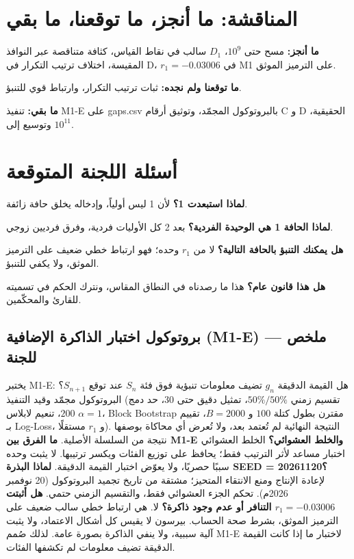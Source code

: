 \documentclass[12pt,a4paper]{article}
\begin{document}
\section{المناقشة: ما أنجز، ما توقعنا، ما بقي}
\textbf{ما أنجز:} مسح حتى $10^9$، $D_1$ سالب في نقاط القياس، كثافة متناقصة عبر النوافذ المقيسة، اختلاف ترتيب التكرار في D، $r_1=-0.03006$ في M1 على الترميز الموثق.

\textbf{ما توقعنا ولم نجده:} ثبات ترتيب التكرار، وارتباط قوي للتنبؤ.

\textbf{ما بقي:} تنفيذ M1-E على \textenglish{gaps.csv} بالبروتوكول المجمّد، وتوثيق أرقام C و D الحقيقية، وتوسيع إلى $10^{11}$.

\section{أسئلة اللجنة المتوقعة}
\textbf{لماذا استبعدت 1؟} لأن 1 ليس أولياً، وإدخاله يخلق حافة زائفة.

\textbf{لماذا الحافة 1 هي الوحيدة الفردية؟} بعد 2 كل الأوليات فردية، وفرق فرديين زوجي.

\textbf{هل يمكنك التنبؤ بالحافة التالية؟} لا من $r_1$ وحده؛ فهو ارتباط خطي ضعيف على الترميز الموثق، ولا يكفي للتنبؤ.

\textbf{هل هذا قانون عام؟} هذا ما رصدناه في النطاق المقاس، ونترك الحكم في تسميته للقارئ والمحكّمين.

\subsection*{بروتوكول اختبار الذاكرة الإضافية (\textenglish{M1-E}) — ملخص للجنة}
يختبر \textenglish{M1-E}: هل القيمة الدقيقة $g_n$ تضيف معلومات تنبؤية فوق فئة $S_n$ عند توقع $S_{n+1}$؟ البروتوكول مجمّد وقيد التنفيذ (تقسيم زمني $50\%/50\%$، تمثيل دقيق حتى $30$، حد دمج $200$، تنعيم لابلاس $\alpha=1$، \textenglish{Block Bootstrap} مقترن بطول كتلة $100$ و $B=2000$، تقييم بـ \textenglish{Log-Loss}، و $r_1$ مستقلًا). النتيجة النهائية لم تُعتمد بعد، ولا تُعرض أي محاكاة بوصفها نتيجة من السلسلة الأصلية.
\textbf{ما الفرق بين \textenglish{M1-E} والخلط العشوائي؟} الخلط العشوائي اختبار مساعد لأثر الترتيب فقط؛ يحافظ على توزيع الفئات ويكسر ترتيبها. لا يثبت وحده سببًا حصريًا، ولا يعوّض اختبار القيمة الدقيقة.
\textbf{لماذا البذرة \textenglish{SEED = 20261120}؟} لإعادة الإنتاج ومنع الانتقاء المتحيز؛ مشتقة من تاريخ تجميد البروتوكول (20 نوفمبر 2026م). تحكم الجزء العشوائي فقط، والتقسيم الزمني حتمي.
\textbf{هل أثبتت $r_1=-0.03006$ التنافر أو عدم وجود ذاكرة؟} لا. هي ارتباط خطي سالب ضعيف على الترميز الموثق، بشرط صحة الحساب. بيرسون لا يقيس كل أشكال الاعتماد، ولا يثبت آلية سببية، ولا ينفي الذاكرة بصورة عامة. لذلك صُمم \textenglish{M1-E} لاختبار ما إذا كانت القيمة الدقيقة تضيف معلومات لم تكشفها الفئات.
\end{document}
